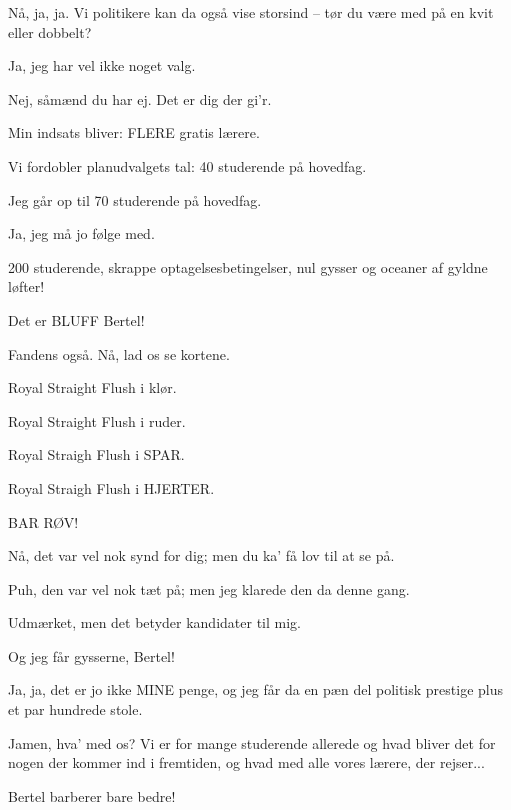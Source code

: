 \documentclass[a4paper,11pt]{article}
\begin{document}
\begin{sketch}
 Nå, ja, ja. Vi politikere kan da også vise storsind -- tør du være med på en kvit eller dobbelt?

 Ja, jeg har vel ikke noget valg.

 Nej, såmænd du har ej. Det er dig der gi'r. 

 Min indsats bliver: FLERE gratis lærere.

 Vi fordobler planudvalgets tal: 40 studerende på hovedfag.

 Jeg går op til 70 studerende på hovedfag.

 Ja, jeg må jo følge med.

 200 studerende, skrappe optagelsesbetingelser, nul gysser og oceaner af gyldne løfter!

 Det er BLUFF Bertel!

 Fandens også. Nå, lad os se kortene.

 Royal Straight Flush i klør.

 Royal Straight Flush i ruder.

 Royal Straigh Flush i SPAR.

 Royal Straigh Flush i HJERTER.

 BAR RØV!

 Nå, det var vel nok synd for dig; men du ka' få lov til at se på.

 Puh, den var vel nok tæt på; men jeg klarede den da denne gang.

 Udmærket, men det betyder kandidater til mig.

 Og jeg får gysserne, Bertel!

 Ja, ja, det er jo ikke MINE penge, og jeg får da en pæn del politisk prestige plus et par hundrede stole.

 Jamen, hva' med os? Vi er for mange studerende allerede og hvad bliver det for nogen der kommer ind i fremtiden, og hvad med alle vores lærere, der rejser... 

 Bertel barberer bare bedre!


\end{sketch}
\end{document}
